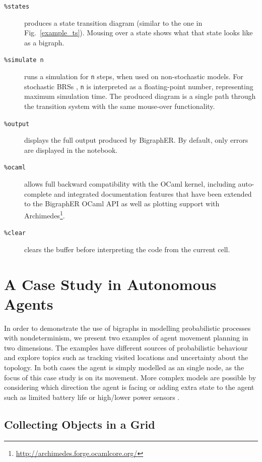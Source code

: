 \documentclass[runningheads]{llncs}
\begin{document}
\begin{description}
  \item[\texttt{\%states}] produces a state transition diagram (similar to the
    one in Fig.~\ref{example_ts}). Mousing over a state shows what that
    state looks like as a bigraph.
  \item[\texttt{\%simulate n}] runs a simulation for \texttt{n} steps, when used
    on non-stochastic models. For stochastic BRSs
    \cite{DBLP:journals/entcs/KrivineMT08}, \texttt{n} is interpreted as a
    floating-point number, representing maximum simulation time. The produced
    diagram is a single path through the transition system with the same
    mouse-over functionality.
  \item[\texttt{\%output}] displays the full output produced by BigraphER. By
    default, only errors are displayed in the notebook.
  \item[\texttt{\%ocaml}] allows full backward compatibility with the OCaml
    kernel, including auto-complete and integrated documentation features that
    have been extended to the BigraphER OCaml API as well as plotting support
    with Archimedes\footnote{\url{http://archimedes.forge.ocamlcore.org/}}.
  \item[\texttt{\%clear}] clears the buffer before interpreting the code from
    the current cell.
\end{description}

\section{A Case Study in Autonomous Agents} \label{case_study}

In order to demonstrate the use of bigraphs in modelling probabilistic
processes with nondeterminism, we present two examples of agent movement
planning in two dimensions. The examples have different sources of probabilistic
behaviour and explore topics such as tracking visited locations and uncertainty
about the topology. In both cases the agent is simply modelled as an single
node, as the focus of this case study is on its movement. More complex models
are possible by considering which direction the agent is facing
\cite{koenig1998xavier} or adding extra state to the agent such as limited
battery life or high/lower power sensors \cite{dblp:conf/nfm/giaquintahimn18}.

\subsection{Collecting Objects in a Grid}
\end{document}
